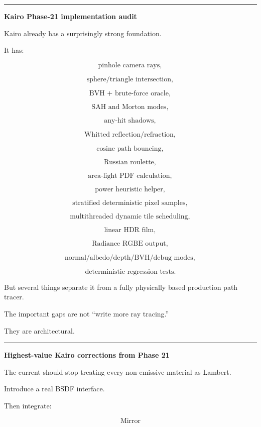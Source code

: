 \begin{center}\rule{0.5\linewidth}{0.5pt}\end{center}

\textbf{Kairo Phase-21 implementation audit}

Kairo already has a surprisingly strong foundation.

It has:

\[
\text{pinhole camera rays},
\]

\[
\text{sphere/triangle intersection},
\]

\[
\text{BVH + brute-force oracle},
\]

\[
\text{SAH and Morton modes},
\]

\[
\text{any-hit shadows},
\]

\[
\text{Whitted reflection/refraction},
\]

\[
\text{cosine path bouncing},
\]

\[
\text{Russian roulette},
\]

\[
\text{area-light PDF calculation},
\]

\[
\text{power heuristic helper},
\]

\[
\text{stratified deterministic pixel samples},
\]

\[
\text{multithreaded dynamic tile scheduling},
\]

\[
\text{linear HDR film},
\]

\[
\text{Radiance RGBE output},
\]

\[
\text{normal/albedo/depth/BVH/debug modes},
\]

\[
\text{deterministic regression tests}.
\]

But several things separate it from a fully physically based production path tracer.

The important gaps are not ``write more ray tracing.''

They are architectural.

\begin{center}\rule{0.5\linewidth}{0.5pt}\end{center}

\textbf{Highest-value Kairo corrections from Phase 21}

The current  should stop treating every non-emissive material as Lambert.

Introduce a real BSDF interface.

Then integrate:

\[
\text{Mirror}
\]

